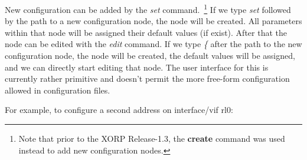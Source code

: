 New configuration can be added by the \emph{set} command.~\footnote{Note that
prior to the XORP Release-1.3, the \textbf{create} command was used instead to
add new configuration nodes.}
If we type \emph{set} followed by the path to a new configuration node,
the node will be created. All parameters within that node will be assigned
their default values (if exist). After that the node can be edited with the
\emph{edit} command.
If we type \emph{\{} after the path to the new configuration node,
the node will be created, the default values will be assigned, and we can
directly start editing that node.
The user interface for this is currently rather
primitive and doesn't permit the more free-form configuration allowed
in configuration files.

\newpage
For example, to configure a second address on interface/vif rl0:
\vspace{0.1in}

\noindent{}

